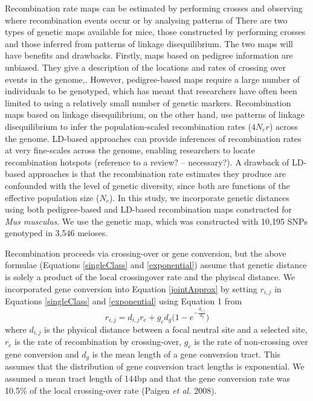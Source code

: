 \documentclass[11pt]{article}
\begin{document}
	Recombination rate maps can be estimated by performing crosses and observing where recombination events occur or by analysing patterns of  
	There are two types of genetic maps available for mice, those constructed by performing crosses and those inferred from patterns of linkage disequilibrium. The two maps will have benefits and drawbacks. Firstly, maps based on pedigree information are unbiased. They give a description of the locations and rates of crossing over events in the genome,. However, pedigree-based maps require a large number of individuals to be genotyped, which has meant that researchers have often been limited to using a relatively small number of genetic markers. Recombination maps based on linkage disequilibrium, on the other hand, use patterns of linkage disequilibrium to infer the population-scaled recombination rates ($4N_er$) across the genome. LD-based approaches can provide inferences of recombination rates at very fine-scales across the genome, enabling researchers to locate recombination hotspots (reference to a review? – necessary?). A drawback of LD-based approaches is that the recombination rate estimates they produce are confounded with the level of genetic diversity, since both are functions of the effective population size ($N_e$). In this study, we incorporate genetic distances using both pedigree-based and LD-based recombination maps constructed for \emph{Mus musculus}. We use the \cite{RN323} genetic map, which was constructed with 10,195 SNPs genotyped in 3,546 meioses. 

	Recombination proceeds via crossing-over or gene conversion, but the above formulae (Equations \ref{singleClass} and \ref{exponential}) assume that genetic distance is solely a product of the local crossingover rate and the phyiscal distance.  We incorporated gene conversion into Equation \ref{jointApprox} by setting $r_{i,j}$ in Equations \ref{singleClass} and \ref{exponential} using Equation 1 from \cite{RN361}
		\begin{equation}
		\label{geneConversion}
		r_{i,j} = d_{i,j} r_c + g_c d_g \Bigg( 1 - e ^{-\frac{d_{i,j}}{d_g}} \Bigg)
		\end{equation}
	where $d_{i,j}$ is the physical distance between a focal neutral site and a selected site, $r_c$ is the rate of recombination by crossing-over, $g_c$ is the rate of non-crossing over gene conversion and $d_g$ is the mean length of a gene conversion tract. This assumes that the distribution of gene conversion tract lengths is exponential. We assumed a mean tract length of 144bp and that the gene conversion rate was 10.5\% of the local crossing-over rate (Paigen \textit{et al.} 2008).
\end{document}
